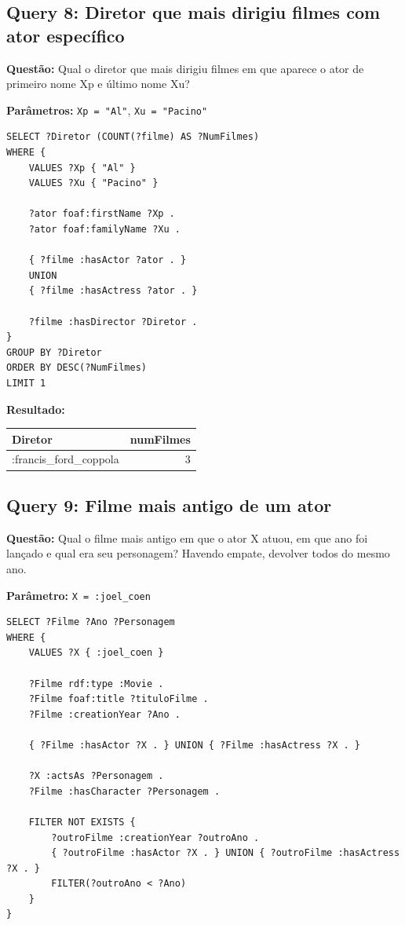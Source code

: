 \documentclass[12pt,a4paper]{article}
\begin{document}
\subsection{Query 8: Diretor que mais dirigiu filmes com ator específico}

\textbf{Questão:} Qual o diretor que mais dirigiu filmes em que aparece o ator de primeiro nome Xp e último nome Xu?

\textbf{Parâmetros:} \texttt{Xp = "Al"}, \texttt{Xu = "Pacino"}

\begin{lstlisting}
SELECT ?Diretor (COUNT(?filme) AS ?NumFilmes)
WHERE {
    VALUES ?Xp { "Al" }
    VALUES ?Xu { "Pacino" }
    
    ?ator foaf:firstName ?Xp .
    ?ator foaf:familyName ?Xu .
    
    { ?filme :hasActor ?ator . } 
    UNION 
    { ?filme :hasActress ?ator . }
    
    ?filme :hasDirector ?Diretor .
}
GROUP BY ?Diretor
ORDER BY DESC(?NumFilmes)
LIMIT 1
\end{lstlisting}

\textbf{Resultado:}

\begin{table}[H]
\centering
\begin{tabular}{|l|r|}
\hline
\textbf{Diretor} & \textbf{numFilmes} \\
\hline
:francis\_ford\_coppola & 3 \\
\hline
\end{tabular}
\end{table}
\newpage
\subsection{Query 9: Filme mais antigo de um ator}

\textbf{Questão:} Qual o filme mais antigo em que o ator X atuou, em que ano foi lançado e qual era seu personagem? Havendo empate, devolver todos do mesmo ano.

\textbf{Parâmetro:} \texttt{X = :joel\_coen}

\begin{lstlisting}
SELECT ?Filme ?Ano ?Personagem
WHERE {
    VALUES ?X { :joel_coen }
    
    ?Filme rdf:type :Movie .
    ?Filme foaf:title ?tituloFilme .
    ?Filme :creationYear ?Ano .
    
    { ?Filme :hasActor ?X . } UNION { ?Filme :hasActress ?X . }
    
    ?X :actsAs ?Personagem .
    ?Filme :hasCharacter ?Personagem .
    
    FILTER NOT EXISTS {
        ?outroFilme :creationYear ?outroAno .
        { ?outroFilme :hasActor ?X . } UNION { ?outroFilme :hasActress ?X . }
        FILTER(?outroAno < ?Ano)
    }
}
\end{lstlisting}
\end{document}
